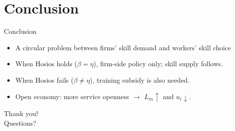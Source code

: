 \documentclass[9pt,xcolor={svgnames}]{beamer}
\begin{document}
\section{Conclusion}
\begin{frame}{Conclusion}\label{main:conclusion}
\small
\begin{itemize}

\item A circular problem between firms' skill demand and workers' skill choice 

\medskip




\medskip
 \item  When Hosios  holds ($\beta=\eta$), firm-side policy only; skill supply follows.


 \medskip

 \item When Hosios fails ($\beta \neq \eta$),  training subsidy is also needed.


\medskip
\item Open economy: more service openness $\rightarrow$ $L_m \uparrow$ and $u_i  \downarrow$.  \hyperlink{app:open}{}









\end{itemize}


\end{frame}


\begin{frame}
  \centering
  \huge Thank you! \\
  \vspace{1em}
  \normalsize Questions?
\end{frame}
\end{document}
